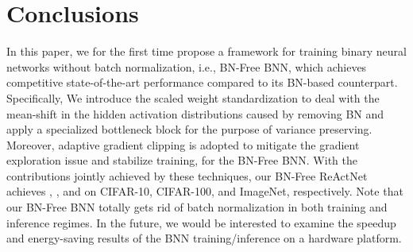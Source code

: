 \documentclass[final]{cvpr}
\begin{document}
\section{Conclusions}
In this paper, we for the first time propose a framework for training binary neural networks without batch normalization, i.e., BN-Free BNN, which achieves competitive state-of-the-art performance compared to its BN-based counterpart. Specifically, We introduce the scaled weight standardization to deal with the mean-shift in the hidden activation distributions caused by removing BN and apply a specialized bottleneck block for the purpose of variance preserving. Moreover, adaptive gradient clipping is adopted to mitigate the gradient exploration issue and stabilize training, for the BN-Free BNN. With the contributions jointly achieved by these techniques, our BN-Free ReActNet achieves , , and  on CIFAR-10, CIFAR-100, and ImageNet, respectively. Note that our BN-Free BNN totally gets rid of batch normalization in both training and inference regimes. In the future, we would be interested to examine the speedup and energy-saving results of the BNN training/inference on a hardware platform.



\clearpage

{\small


}
\end{document}
